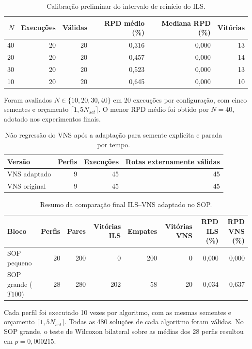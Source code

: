 
\begin{table}[htbp]
\centering
\caption{Calibração preliminar do intervalo de reinício do ILS.}
\label{tab:ils-calibration}
\begin{tabular}{rrrrrr}
\toprule
$N$ & Execuções & Válidas & RPD médio (\%) & Mediana RPD (\%) & Vitórias \\
\midrule
40 & 20 & 20 & 0{,}316 & 0{,}000 & 13 \\
20 & 20 & 20 & 0{,}457 & 0{,}000 & 14 \\
30 & 20 & 20 & 0{,}523 & 0{,}000 & 13 \\
10 & 20 & 20 & 0{,}645 & 0{,}000 & 10 \\
\bottomrule
\end{tabular}
\begin{minipage}{0.93\linewidth}\footnotesize
Foram avaliados $N\in\{10,20,30,40\}$ em 20 execuções por configuração, com cinco sementes e orçamento $\lceil1{,}5N_{set}\rceil$. O menor RPD médio foi obtido por $N=40$, adotado nos experimentos finais.
\end{minipage}
\end{table}

\begin{table}[htbp]
\centering
\caption{Não regressão do VNS após a adaptação para semente explícita e parada por tempo.}
\label{tab:vns-nonregression}
\begin{tabular}{lrrr}
\toprule
Versão & Perfis & Execuções & Rotas externamente válidas \\
\midrule
VNS adaptado & 9 & 45 & 45 \\
VNS original & 9 & 45 & 45 \\
\bottomrule
\end{tabular}
\end{table}

\begin{table}[htbp]
\centering
\caption{Resumo da comparação final ILS--VNS adaptado no SOP.}
\label{tab:ils-vns-sop-summary}
\begin{tabular}{lrrrrrrr}
\toprule
Bloco & Perfis & Pares & Vitórias ILS & Empates & Vitórias VNS & RPD ILS (\%) & RPD VNS (\%) \\
\midrule
SOP pequeno & 20 & 200 & 0 & 200 & 0 & 0{,}000 & 0{,}000 \\
SOP grande ($T100$) & 28 & 280 & 202 & 58 & 20 & 0{,}034 & 0{,}637 \\
\bottomrule
\end{tabular}
\begin{minipage}{0.94\linewidth}\footnotesize
Cada perfil foi executado 10 vezes por algoritmo, com as mesmas sementes e orçamento $\lceil1{,}5N_{set}\rceil$. Todas as 480 soluções de cada algoritmo foram válidas. No SOP grande, o teste de Wilcoxon bilateral sobre as médias dos 28 perfis resultou em $p=0{,}000215$. 
\end{minipage}
\end{table}

